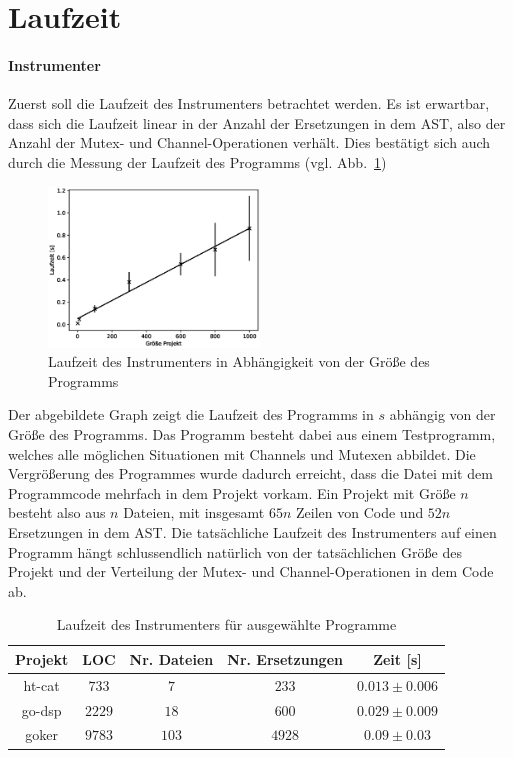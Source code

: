\section{Laufzeit}\label{Chap:Tracer-Sec:Laufzeit}
\paragraph{Instrumenter} Zuerst soll die Laufzeit des Instrumenters betrachtet 
werden. Es ist erwartbar, 
dass sich die Laufzeit linear in der Anzahl der Ersetzungen in dem AST, also 
der Anzahl der Mutex- und Channel-Operationen verhält. Dies bestätigt sich auch durch 
die Messung der Laufzeit des Programms (vgl. 
Abb.~\ref{Chap:Tracer-Sec:Laufzeit-Img:LaufzeitTracer})
\begin{figure}[h!]
  \includegraphics[width=0.5\textwidth]{img/tracer/Runtime_Instrumenter.eps}
  \caption{Laufzeit des Instrumenters in Abhängigkeit von der Größe des 
  Programms}
  \label{Chap:Tracer-Sec:Laufzeit-Img:LaufzeitTracer}
\end{figure} 
Der abgebildete Graph zeigt die Laufzeit des Programms in $s$ abhängig von der 
Größe des Programms. Das Programm besteht dabei aus einem Testprogramm, welches 
alle möglichen Situationen mit Channels und Mutexen abbildet. Die Vergrößerung 
des Programmes wurde dadurch erreicht, dass die Datei mit dem Programmcode 
mehrfach in dem Projekt vorkam. Ein Projekt mit Größe $n$ besteht also 
aus $n$ Dateien, mit insgesamt $65n$ Zeilen von Code und $52n$ Ersetzungen
in dem AST. Die tatsächliche Laufzeit des Instrumenters auf einen 
Programm hängt schlussendlich natürlich von der tatsächlichen Größe des 
Projekt und der Verteilung der Mutex- und Channel-Operationen in dem Code ab.\\
\begin{table}[!h]
  \centering
  \begin{tabular}{|c|c|c|c|c|}
  \hline
  Projekt & LOC & Nr. Dateien & Nr. Ersetzungen & Zeit {[}s{]} \\ \hline
  ht-cat & $733$ & $7$ & $233$ & $0.013 \pm 0.006$ \\ \hline
  go-dsp & $2229$ & $18$ & $600$ & $0.029 \pm 0.009$ \\ \hline
  goker & $9783$ & $103$ & $4928$ & $0.09 \pm 0.03$ \\ \hline
  \end{tabular}
  \caption{Laufzeit des Instrumenters für ausgewählte Programme}
  \label{Chap:Tracer-Sec:Laufzeit-Tab:LaufzeitTracer}
\end{table}
